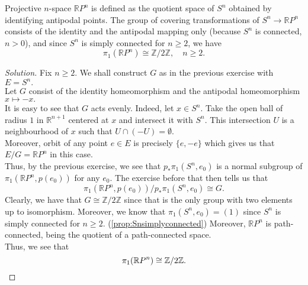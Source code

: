 \documentclass[12pt]{article}
\newenvironment{soln}{\begin{proof}[Solution]}{\end{proof}}
\begin{document}
\begin{exe}
	Projective $n$-space $\mathbb{R}P^n$ is defined as the quotient space of $S^n$ obtained by identifying antipodal points. The group of covering transformations of $S^n \to \mathbb{R}P^n$ consists of the identity and the antipodal mapping only (because $S^n$ is connected, $n > 0$), and since $S^n$ is simply connected for $n \ge 2$, we have
	\begin{equation*} 
		\pi_1(\mathbb{R}P^n) \cong \mathbb{Z}/2\mathbb{Z}, \quad n \ge 2.
	\end{equation*}
\end{exe}
\begin{soln}
	Fix $n \ge 2.$ We shall construct $G$ as in the previous exercise with $E = S^n.$\\
	Let $G$ consist of the identity homeomorphism and the antipodal homeomorphism $x \mapsto -x.$\\
	It is easy to see that $G$ acts evenly. Indeed, let $x \in S^n.$ Take the open ball of radius $1$ in $\mathbb{R}^{n+1}$ centered at $x$ and intersect it with $S^n.$ This intersection $U$ is a neighbourhood of $x$ such that $U \cap (-U) = \emptyset.$\\
	Moreover, orbit of any point $e \in E$ is precisely $\{e, -e\}$ which gives us that $E/G = \mathbb{R}P^n$ in this case.\\
	Thus, by the previous exercise, we see that $p_*\pi_1(S^n, e_0)$ is a normal subgroup of $\pi_1(\mathbb{R}P^n, p(e_0))$ for any $e_0.$ The exercise before that then tells us that
	\begin{equation*} 
		\pi_1(\mathbb{R}P^n, p(e_0))/p_*\pi_1(S^n, e_0) \cong G.
	\end{equation*}
	Clearly, we have that $G \cong \mathbb{Z}/2\mathbb{Z}$ since that is the only group with two elements up to isomorphism. Moreover, we know that $\pi_1(S^n, e_0) = (1)$ since $S^n$ is simply connected for $n \ge 2.$ (\cref{prop:Snsimplyconnected}) Moreover, $\mathbb{R}P^n$ is path-connected, being the quotient of a path-connected space. \\
	Thus, we see that
	\begin{equation*} 
		\pi_1(\mathbb{R}P^n) \cong \mathbb{Z}/2\mathbb{Z}. \qedhere
	\end{equation*}
\end{soln}
\end{document}
